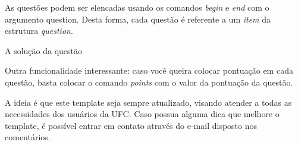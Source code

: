\documentclass{ufcatemplates}
\begin{document}
    \makeheaderexam

    \vspace{1cm}
    

    \question As questões podem ser elencadas usando os comandos \textit{begin} e \textit{end} com o argumento question. Desta forma, cada questão é referente a um \textit{item} da estrutura \textit{question}.

    \begin{sol}
      A solução da questão
      
    
    \end{sol}

    \question Outra funcionalidade interessante: caso você queira colocar pontuação em cada questão, basta colocar o comando \textit{points} com o valor da pontuação da questão. 
        
    \question A ideia é que este template seja sempre atualizado, visando atender a todas as necessidades dos usuários da UFC. Caso possua alguma dica que melhore o template, é possível entrar em contato através do e-mail disposto nos comentários.
\end{document}
